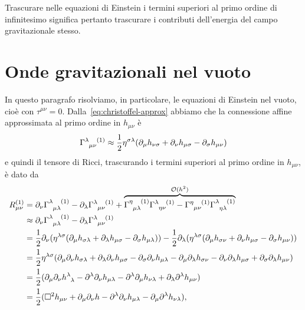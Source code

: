 Trascurare nelle equazioni di Einstein i termini superiori al primo ordine di
infinitesimo significa pertanto trascurare i contributi dell'energia del campo
gravitazionale stesso.

\section{Onde gravitazionali nel vuoto}
\label{sec:onde-grav-vuoto}

In questo paragrafo risolviamo, in particolare, le equazioni di Einstein nel
vuoto, cioè con $\tau^{\mu\nu} = 0$.  Dalla~\eqref{eq:christoffel-approx}
abbiamo che la connessione affine approssimata al primo ordine in $h_{\mu\nu}$ è
\begin{equation}
  \tensor{\Gamma}{^{\lambda}_{\mu\nu}^{(1)}} \approx \frac{1}{2}\eta^{\sigma\lambda}
  (\partial_{\mu}h_{\nu\sigma} + \partial_{\nu}h_{\mu\sigma}
  - \partial_{\sigma}h_{\mu\nu})
\end{equation}
e quindi il tensore di Ricci, trascurando i termini superiori al primo ordine in
$h_{\mu\nu}$, è dato da
\begin{equation}
  \label{eq:ricci-lineare}
  \begin{split}
    R_{\mu\nu}^{(1)} &= \partial_{\nu}
    \tensor{\Gamma}{^{\lambda}_{\mu\lambda}^{(1)}}
    - \partial_{\lambda} \tensor{\Gamma}{^{\lambda}_{\mu\nu}^{(1)}} +
    \overbrace{\tensor{\Gamma}{^{\eta}_{\mu\lambda}^{(1)}}
      \tensor{\Gamma}{^{\lambda}_{\eta\nu}^{(1)}} -
      \tensor{\Gamma}{^{\eta}_{\mu\nu}^{(1)}}
      \tensor{\Gamma}{^{\lambda}_{\eta\lambda}^{(1)}}}^{\mathcal{O}(h^{2})} \\
    &\approx \partial_{\nu}\tensor{\Gamma}{^{\lambda}_{\mu\lambda}^{(1)}}
    - \partial_{\lambda} \tensor{\Gamma}{^{\lambda}_{\mu\nu}^{(1)}} \\
    &= \frac{1}{2}\partial_{\nu} (\eta^{\lambda\sigma}(\partial_{\mu}
    h_{\sigma\lambda} + \partial_{\lambda}h_{\mu\sigma}
    - \partial_{\sigma}h_{\mu\lambda})) -
    \frac{1}{2}\partial_{\lambda}(\eta^{\lambda\sigma}(\partial_{\mu}h_{\sigma\nu}
    + \partial_{\nu}h_{\mu\sigma} - \partial_{\sigma}h_{\mu\nu})) \\
    &= \frac{1}{2} \eta^{\lambda\sigma}(\partial_{\mu}\partial_{\nu}
    h_{\sigma\lambda} + \partial_{\lambda}\partial_{\nu} h_{\mu\sigma}
    - \partial_{\sigma}\partial_{\nu} h_{\mu\lambda}
    - \partial_{\mu}\partial_{\lambda} h_{\sigma\nu}
    - \partial_{\nu}\partial_{\lambda} h_{\mu\sigma}
    + \partial_{\sigma}\partial_{\lambda} h_{\mu\nu}) \\
    &= \frac{1}{2}(\partial_{\mu}\partial_{\nu}
    \tensor{h}{^{\lambda}_{\lambda}} - \partial^{\lambda}\partial_{\nu}
    h_{\mu\lambda} - \partial^{\lambda}\partial_{\mu} h_{\nu\lambda}
    + \partial_{\lambda}\partial^{\lambda} h_{\mu\nu}) \\
    &= \frac{1}{2} (\dalamb h_{\mu\nu} + \partial_{\mu}\partial_{\nu} h
    - \partial^{\lambda}\partial_{\nu} h_{\mu\lambda}
    - \partial_{\mu}\partial^{\lambda} h_{\nu\lambda}),
  \end{split}
\end{equation}
